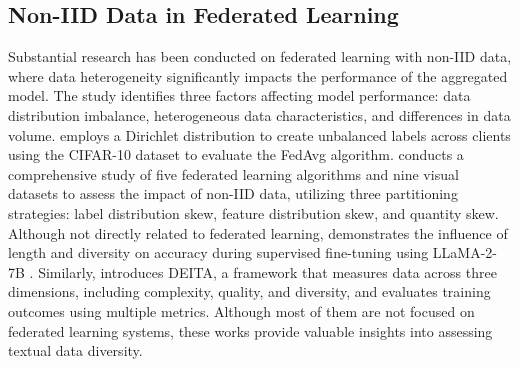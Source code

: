 \subsection{Non-IID Data in Federated Learning}
Substantial research has been conducted on federated learning with non-IID data, where data heterogeneity significantly impacts the performance of the aggregated model. The study \cite{luFederatedLearningNonIID2024} identifies three factors affecting model performance: data distribution imbalance, heterogeneous data characteristics, and differences in data volume. \cite{hsuMeasuringEffectsNonIdentical2019} employs a Dirichlet distribution to create unbalanced labels across clients using the CIFAR-10 dataset to evaluate the FedAvg algorithm. \cite{liFederatedLearningNonIID2022a} conducts a comprehensive study of five federated learning algorithms and nine visual datasets to assess the impact of non-IID data, utilizing three partitioning strategies: label distribution skew, feature distribution skew, and quantity skew. Although not directly related to federated learning, \cite{shenRethinkingDataSelection2024} demonstrates the influence of length and diversity on accuracy during supervised fine-tuning using LLaMA-2-7B \cite{touvronLlamaOpenFoundation2023}. Similarly, \cite{liuWhatMakesGood2024} introduces DEITA, a framework that measures data across three dimensions, including complexity, quality, and diversity, and evaluates training outcomes using multiple metrics. Although most of them are not focused on federated learning systems, these works provide valuable insights into assessing textual data diversity.


